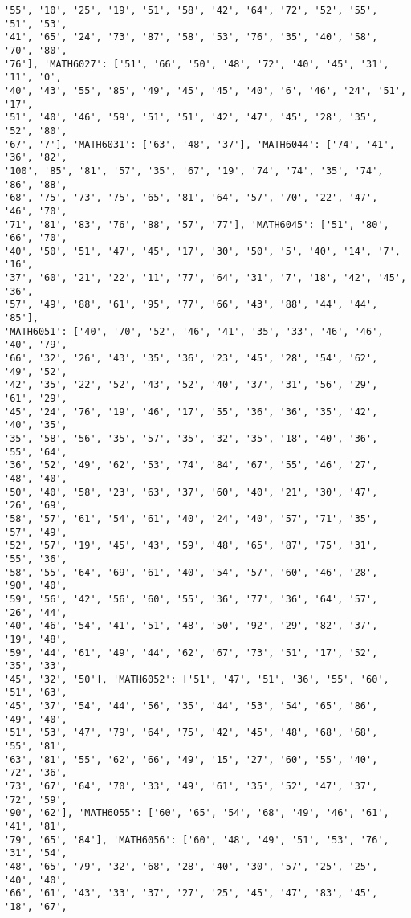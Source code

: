 \documentclass[11pt]{article}
\begin{document}
\begin{Verbatim}[commandchars=\\\{\}]
'55', '10', '25', '19', '51', '58', '42', '64', '72', '52', '55', '51', '53',
'41', '65', '24', '73', '87', '58', '53', '76', '35', '40', '58', '70', '80',
'76'], 'MATH6027': ['51', '66', '50', '48', '72', '40', '45', '31', '11', '0',
'40', '43', '55', '85', '49', '45', '45', '40', '6', '46', '24', '51', '17',
'51', '40', '46', '59', '51', '51', '42', '47', '45', '28', '35', '52', '80',
'67', '7'], 'MATH6031': ['63', '48', '37'], 'MATH6044': ['74', '41', '36', '82',
'100', '85', '81', '57', '35', '67', '19', '74', '74', '35', '74', '86', '88',
'68', '75', '73', '75', '65', '81', '64', '57', '70', '22', '47', '46', '70',
'71', '81', '83', '76', '88', '57', '77'], 'MATH6045': ['51', '80', '66', '70',
'40', '50', '51', '47', '45', '17', '30', '50', '5', '40', '14', '7', '16',
'37', '60', '21', '22', '11', '77', '64', '31', '7', '18', '42', '45', '36',
'57', '49', '88', '61', '95', '77', '66', '43', '88', '44', '44', '85'],
'MATH6051': ['40', '70', '52', '46', '41', '35', '33', '46', '46', '40', '79',
'66', '32', '26', '43', '35', '36', '23', '45', '28', '54', '62', '49', '52',
'42', '35', '22', '52', '43', '52', '40', '37', '31', '56', '29', '61', '29',
'45', '24', '76', '19', '46', '17', '55', '36', '36', '35', '42', '40', '35',
'35', '58', '56', '35', '57', '35', '32', '35', '18', '40', '36', '55', '64',
'36', '52', '49', '62', '53', '74', '84', '67', '55', '46', '27', '48', '40',
'50', '40', '58', '23', '63', '37', '60', '40', '21', '30', '47', '26', '69',
'58', '57', '61', '54', '61', '40', '24', '40', '57', '71', '35', '57', '49',
'52', '57', '19', '45', '43', '59', '48', '65', '87', '75', '31', '55', '36',
'58', '55', '64', '69', '61', '40', '54', '57', '60', '46', '28', '90', '40',
'59', '56', '42', '56', '60', '55', '36', '77', '36', '64', '57', '26', '44',
'40', '46', '54', '41', '51', '48', '50', '92', '29', '82', '37', '19', '48',
'59', '44', '61', '49', '44', '62', '67', '73', '51', '17', '52', '35', '33',
'45', '32', '50'], 'MATH6052': ['51', '47', '51', '36', '55', '60', '51', '63',
'45', '37', '54', '44', '56', '35', '44', '53', '54', '65', '86', '49', '40',
'51', '53', '47', '79', '64', '75', '42', '45', '48', '68', '68', '55', '81',
'63', '81', '55', '62', '66', '49', '15', '27', '60', '55', '40', '72', '36',
'73', '67', '64', '70', '33', '49', '61', '35', '52', '47', '37', '72', '59',
'90', '62'], 'MATH6055': ['60', '65', '54', '68', '49', '46', '61', '41', '81',
'79', '65', '84'], 'MATH6056': ['60', '48', '49', '51', '53', '76', '31', '54',
'48', '65', '79', '32', '68', '28', '40', '30', '57', '25', '25', '40', '40',
'66', '61', '43', '33', '37', '27', '25', '45', '47', '83', '45', '18', '67',

\end{Verbatim}
\end{document}
